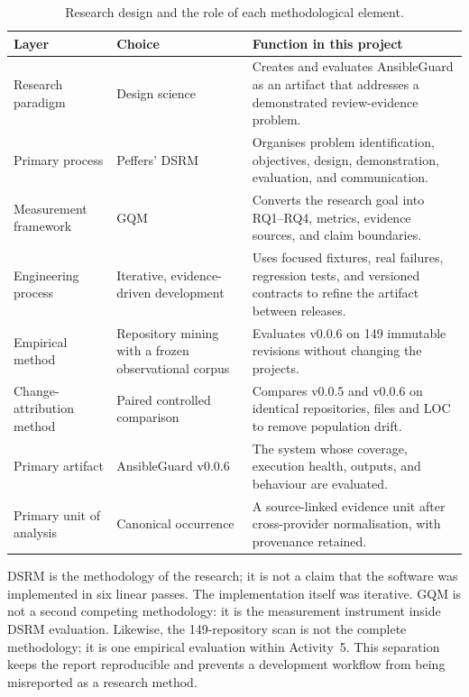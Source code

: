 \begin{table}[H]
\centering
\caption{Research design and the role of each methodological element.}
\label{tab:research_design_glance}
\small
\begin{tabular}{p{3.2cm}p{4.0cm}p{7.0cm}}
\toprule
Layer & Choice & Function in this project \\
\midrule
Research paradigm & Design science & Creates and evaluates AnsibleGuard as an
artifact that addresses a demonstrated review-evidence problem. \\
Primary process & Peffers' DSRM & Organises problem identification, objectives,
design, demonstration, evaluation, and communication. \\
Measurement framework & GQM & Converts the research goal into RQ1--RQ4,
metrics, evidence sources, and claim boundaries. \\
Engineering process & Iterative, evidence-driven development & Uses focused
fixtures, real failures, regression tests, and versioned contracts to refine
the artifact between releases. \\
Empirical method & Repository mining with a frozen observational corpus &
Evaluates v0.0.6 on 149 immutable revisions without changing the projects. \\
Change-attribution method & Paired controlled comparison & Compares v0.0.5 and
v0.0.6 on identical repositories, files and LOC to remove population drift. \\
Primary artifact & AnsibleGuard v0.0.6 & The system whose coverage, execution
health, outputs, and behaviour are evaluated. \\
Primary unit of analysis & Canonical occurrence & A source-linked evidence unit
after cross-provider normalisation, with provenance retained. \\
\bottomrule
\end{tabular}
\end{table}

DSRM is the methodology of the research; it is not a claim that the software
was implemented in six linear passes. The implementation itself was iterative.
GQM is not a second competing methodology: it is the measurement instrument
inside DSRM evaluation. Likewise, the 149-repository scan is not the complete
methodology; it is one empirical evaluation within Activity~5. This separation
keeps the report reproducible and prevents a development workflow from being
misreported as a research method.


